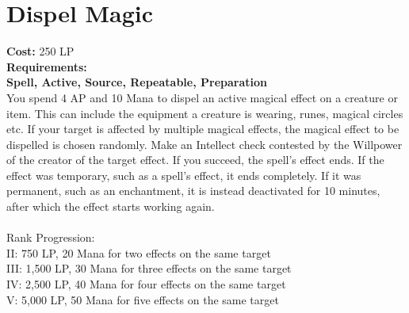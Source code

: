 \section{Dispel Magic}\label{spell:dispelMagic}
\textbf{Cost:} 250 LP\\
\textbf{Requirements:}\\
\textbf{Spell, Active, Source, Repeatable, Preparation}\\
You spend 4 AP and 10 Mana to dispel an active magical effect on a creature or item.
This can include the equipment a creature is wearing, runes, magical circles etc.
If your target is affected by multiple magical effects, the magical effect to be dispelled is chosen randomly.
Make an Intellect check contested by the Willpower of the creator of the target effect.
If you succeed, the spell's effect ends.
If the effect was temporary, such as a spell's effect, it ends completely.
If it was permanent, such as an enchantment, it is instead deactivated for 10 minutes, after which the effect starts working again.\\
\\
Rank Progression:\\
II: 750 LP, 20 Mana for two effects on the same target\\
III: 1,500 LP, 30 Mana for three effects on the same target\\
IV: 2,500 LP, 40 Mana for four effects on the same target\\
V: 5,000 LP, 50 Mana for five effects on the same target\\
